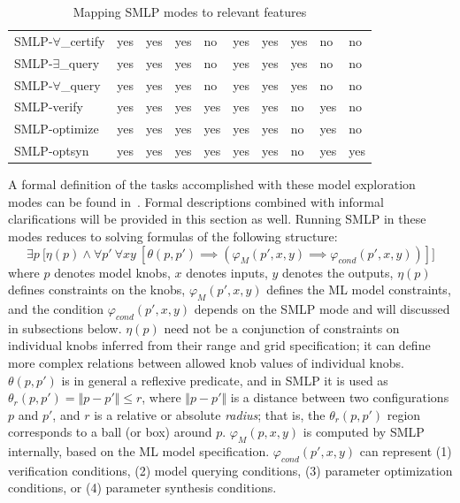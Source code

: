 \documentclass[a4paper,parskip=half]{article} %
\newcommand*\eqdef=
\begin{document}
\begin{table}
{\begin{tabular}{llllllllll}
SMLP-$\forall$\_certify &    yes &   yes &   yes &   no & yes &   yes &     yes &         no &         no \\
  SMLP-$\exists$\_query &    yes &   yes &   yes &   no & yes &   yes &     yes &         no &         no \\
  SMLP-$\forall$\_query &    yes &   yes &   yes &   no & yes &   yes &     yes &         no &         no \\
   SMLP-verify &    yes &   yes &   yes &  yes & yes &   yes &      no &        yes &         no \\
 SMLP-optimize &    yes &   yes &   yes &  yes & yes &   yes &      no &         yes &         no \\
   SMLP-optsyn &    yes &   yes &   yes &  yes & yes &   yes &      no &        yes &        yes \\
\bottomrule
\end{tabular}
}
\label{smlp:modes:features}
\caption{Mapping SMLP modes to relevant features}
\end{table}


A formal definition of the tasks accomplished with these model exploration modes can be found in~\cite{brausse2024smlp}. 
Formal descriptions combined with informal clarifications will be provided in this section as well. 
Running SMLP in these modes reduces to solving formulas of the following structure:
\begin{equation}\label{form:gear:final}
    \exists p ~\big[ \eta(p) \wedge
    \forall p'~
    \forall x y~[
    \theta(p,p') \implies (\varphi_M(p',x,y)  \implies  \varphi_{\mathit{cond}}(p',x,y))
    ]\big]
\end{equation}
where $p$ denotes model knobs, $x$ denotes inputs, $y$ denotes the outputs, $\eta(p)$ defines 
constraints on the knobs,  $\varphi_M(p',x,y)$ defines the ML model constraints, and the condition
$\varphi_{\mathit{cond}}(p',x,y)$ depends on the SMLP mode and will discussed in subsections below.
$\eta(p)$ need not be a conjunction of constraints on individual knobs inferred from their range and grid
specification; it can define more complex relations between allowed knob values of individual knobs.
$\theta(p,p')$ is in general a reflexive predicate, and in SMLP it is used as 
$\theta_r(p, p') \eqdef \Vert p - p' \Vert \leq r$, where  $\Vert p - p' \Vert$ is a distance between 
two configurations $p$ and $p'$, and $r$ is a relative or absolute \emph{radius}; that is, 
the $\theta_r(p, p')$ region corresponds to a ball (or box) around $p$.
$\varphi_M(p,x,y)$ is computed by SMLP internally, based on the ML model specification.
$\varphi_{\mathit{cond}}(p',x,y)$  can represent (1) verification conditions, (2) model querying conditions, 
(3) parameter optimization conditions, or (4) parameter synthesis conditions.
\end{document}
